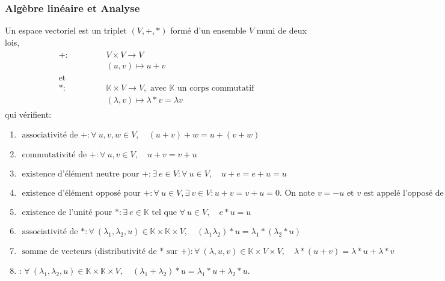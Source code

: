 \documentclass[letterpaper,11pt,english]{sphinxmanual}
\begin{document}
\subsubsection{Algèbre linéaire et Analyse}
\label{\detokenize{chapter2:algebre-lineaire-et-analyse}}
\sphinxAtStartPar
{} Un espace vectoriel est un triplet
\((V, +, *)\) formé d’un ensemble \(V\) muni de deux lois,
\begin{equation}\label{equation:chapter2:chapter2:0}
\begin{split}\begin{aligned}
     +:\quad & V\times V \longrightarrow{V}\\
    &(u,v)\mapsto u+v \\
    \text{et} \qquad \qquad\\
    *:\quad &\mathbb{K}\times V \longrightarrow{V}, \text{ avec $\mathbb{K}$ un corps commutatif}\\
    &(\lambda,v)\mapsto \lambda * v=\lambda v\end{aligned}\end{split}
\end{equation}
\sphinxAtStartPar
qui vérifient:
\begin{enumerate}
%
\item {} 
\sphinxAtStartPar
\(\text{ associativité de } + :  \forall\  u,v, w \in V, \quad (u+v)+w=u+(v+w)\)

\item {} 
\sphinxAtStartPar
\(\text{ commutativité de } + : \forall\ u,v\in V,\quad u+v=v+u\)

\item {} 
\sphinxAtStartPar
\(\text{ existence d'élément neutre pour } + :  \exists~ e \in V : \forall\ u \in V, \quad u+e=e+u=u\)

\item {} 
\sphinxAtStartPar
\(\text{ existence d'élément opposé pour } + : \forall \ u \in V, \exists ~ v \in V :u+v=v+u=0. \text{ On note } v=-u \text{ et } v \text{ est appelé l'opposé de } u\)

\item {} 
\sphinxAtStartPar
\(\text{ existence de l'unité pour } * :  \exists~ e \in \mathbb{K} \text{ tel que } \forall\  u\in V,\quad e*u=u\)

\item {} 
\sphinxAtStartPar
\(\text{ associativité de } * :  \forall\  (\lambda_1, \lambda_2, u) \in \mathbb{K} \times \mathbb{K}\times V,\quad  (\lambda_1 \lambda_2)* u =\lambda_1*(\lambda_2 * u)\)

\item {} 
\sphinxAtStartPar
\(\text{ somme de vecteurs (distributivité de * sur +)} :  \forall\  (\lambda, u, v) \in \mathbb{K}\times V\times V, \quad\lambda*(u+v)=\lambda * u+\lambda * v\)

\item {} 
\sphinxAtStartPar
:
\(\forall\  (\lambda_1, \lambda_2, u) \in \mathbb{K} \times \mathbb{K}\times V,\quad  (\lambda_1+\lambda_2) * u=\lambda_1 * u +\lambda_2 * u.\)

\end{enumerate}
\end{document}
